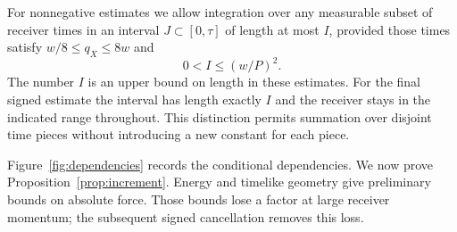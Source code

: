 For nonnegative estimates we allow integration over any measurable
subset of receiver times in an interval $J\subset[0,\tau]$ of length
at most $I$, provided those times satisfy $w/8\le q_X\le8w$ and
\begin{equation}\label{eq:short-I}
 0<I\le (w/P)^2.
\end{equation}
The number $I$ is an upper bound on length in these estimates.
For the final signed estimate the interval has length exactly $I$
and the receiver stays in the indicated range throughout.
This distinction permits summation over disjoint time pieces without
introducing a new constant for each piece.

Figure~\ref{fig:dependencies} records the conditional dependencies.
We now prove Proposition~\ref{prop:increment}. Energy and timelike
geometry give preliminary bounds on absolute force. Those bounds
lose a factor at large receiver momentum; the subsequent signed
cancellation removes this loss.

\begin{figure}[htbp]
\centering


\end{figure}
